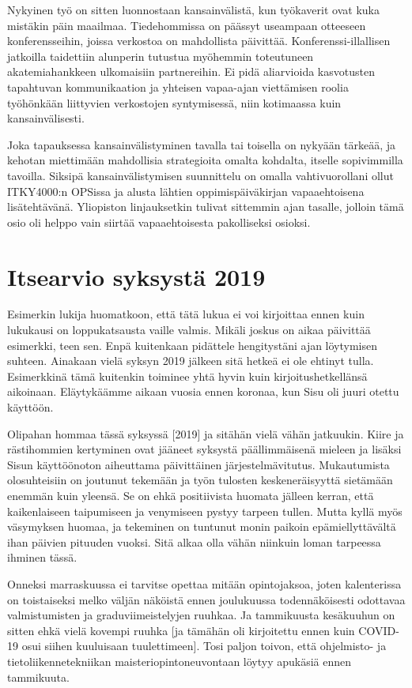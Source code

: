 \documentclass[utf8]{gradu3}
\begin{document}
Nykyinen työ on sitten luonnostaan kansainvälistä, kun työkaverit ovat kuka
mistäkin päin maailmaa. Tiedehommissa on päässyt useampaan otteeseen
konferensseihin, joissa verkostoa on mahdollista päivittää.
Konferenssi-illallisen jatkoilla taidettiin alunperin tutustua myöhemmin
toteutuneen akatemiahankkeen ulkomaisiin partnereihin. Ei pidä aliarvioida
kasvotusten tapahtuvan kommunikaation ja yhteisen vapaa-ajan viettämisen roolia
työhönkään liittyvien verkostojen syntymisessä, niin kotimaassa kuin
kansainvälisesti.

Joka tapauksessa kansainvälistyminen tavalla tai toisella on nykyään tärkeää, ja
kehotan miettimään mahdollisia strategioita omalta kohdalta, itselle
sopivimmilla tavoilla. Siksipä kansainvälistymisen suunnittelu on omalla
vahtivuorollani ollut ITKY4000:n OPSissa ja alusta lähtien oppimispäiväkirjan
vapaaehtoisena lisätehtävänä. Yliopiston linjauksetkin tulivat sittemmin ajan
tasalle, jolloin tämä osio oli helppo vain siirtää vapaaehtoisesta pakolliseksi
osioksi.

\section{Itsearvio syksystä 2019}

Esimerkin lukija huomatkoon, että tätä lukua ei voi kirjoittaa ennen kuin
lukukausi on loppukatsausta vaille valmis. Mikäli joskus on aikaa päivittää
esimerkki, teen sen. Enpä kuitenkaan pidättele hengitystäni ajan löytymisen
suhteen. Ainakaan vielä syksyn 2019 jälkeen sitä hetkeä ei ole ehtinyt tulla.
Esimerkkinä tämä kuitenkin toiminee yhtä hyvin kuin kirjoitushetkellänsä
aikoinaan. Eläytykäämme aikaan vuosia ennen koronaa, kun Sisu oli juuri otettu
käyttöön.

Olipahan hommaa tässä syksyssä [2019] ja sitähän vielä vähän jatkuukin. Kiire ja
rästihommien kertyminen ovat jääneet syksystä päällimmäisenä mieleen ja lisäksi
Sisun käyttöönoton aiheuttama päivittäinen järjestelmävitutus.
%
Mukautumista olosuhteisiin on joutunut tekemään ja työn tulosten
keskeneräisyyttä sietämään enemmän kuin yleensä.
%
Se on ehkä positiivista huomata jälleen kerran, että kaikenlaiseen taipumiseen
ja venymiseen pystyy tarpeen tullen.
%
Mutta kyllä myös väsymyksen huomaa, ja tekeminen on tuntunut monin paikoin
epämiellyttävältä ihan päivien pituuden vuoksi. Sitä alkaa olla vähän niinkuin
loman tarpeessa ihminen tässä.

Onneksi marraskuussa ei tarvitse opettaa mitään opintojaksoa, joten kalenterissa
on toistaiseksi melko väljän näköistä ennen joulukuussa todennäköisesti
odottavaa valmistumisten ja graduviimeistelyjen ruuhkaa. Ja tammikuusta
kesäkuuhun on sitten ehkä vielä kovempi ruuhka [ja tämähän oli kirjoitettu ennen
kuin COVID-19 osui siihen kuuluisaan tuulettimeen]. Tosi paljon toivon, että
ohjelmisto- ja tietoliikennetekniikan maisteriopintoneuvontaan löytyy apukäsiä
ennen tammikuuta.
\end{document}
